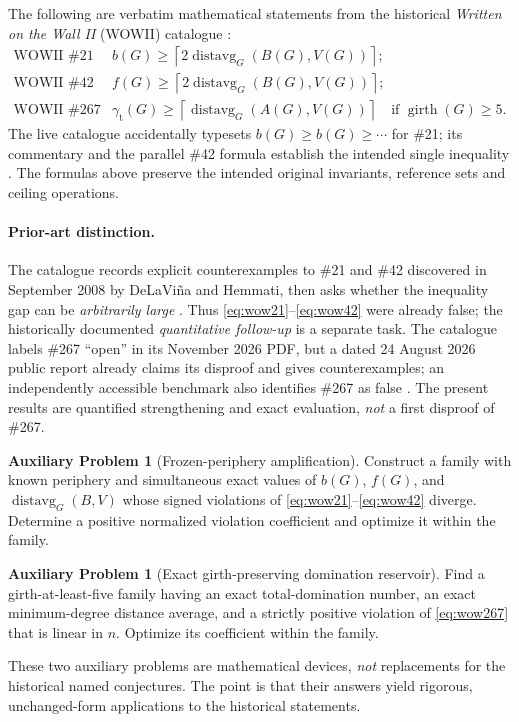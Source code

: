 \documentclass[11pt,a4paper]{article}
\theoremstyle{definition}
\newtheorem{problem}[theorem]{Auxiliary Problem}
\theoremstyle{remark}
\newcommand{\avg}{\operatorname{distavg}}
\newcommand{\girth}{\operatorname{girth}}
\newcommand{\gam}{\gamma_{\mathrm t}}
\begin{document}
The following are verbatim mathematical statements from the historical \emph{Written on the Wall II} (WOWII) catalogue \cite{wowii}:
\begin{align}
\text{WOWII \#21 (2003):}\quad& b(G)\ge\left\lceil2\avg_G(B(G),V(G))\right\rceil; \label{eq:wow21}\\
\text{WOWII \#42 (2004):}\quad& f(G)\ge\left\lceil2\avg_G(B(G),V(G))\right\rceil; \label{eq:wow42}\\
\text{WOWII \#267 (2007):}\quad& \gam(G)\ge\left\lceil\avg_G(A(G),V(G))\right\rceil
\quad\text{if }\girth(G)\ge5. \label{eq:wow267}
\end{align}
The live catalogue accidentally typesets $b(G)\ge b(G)\ge\cdots$ for \#21; its commentary and the parallel \#42 formula establish the intended single inequality \cite{wowii}. The formulas above preserve the intended original invariants, reference sets and ceiling operations.

\paragraph{Prior-art distinction.} The catalogue records explicit counterexamples to \#21 and \#42 discovered in September 2008 by DeLaVi\~na and Hemmati, then asks whether the inequality gap can be \emph{arbitrarily large} \cite{wowii}. Thus \eqref{eq:wow21}--\eqref{eq:wow42} were already false; the historically documented \emph{quantitative follow-up} is a separate task. The catalogue labels \#267 ``open'' in its November 2026 PDF, but a dated 24 August 2026 public report already claims its disproof and gives counterexamples; an independently accessible benchmark also identifies \#267 as false \cite{village,mathbench}. The present results are quantified strengthening and exact evaluation, \emph{not} a first disproof of \#267.

\begin{problem}[Frozen-periphery amplification]\label{prob:cam}
Construct a family with known periphery and simultaneous exact values of $b(G)$, $f(G)$, and $\avg_G(B,V)$ whose signed violations of \eqref{eq:wow21}--\eqref{eq:wow42} diverge. Determine a positive normalized violation coefficient and optimize it within the family.
\end{problem}
\begin{problem}[Exact girth-preserving domination reservoir]\label{prob:dom}
Find a girth-at-least-five family having an exact total-domination number, an exact minimum-degree distance average, and a strictly positive violation of \eqref{eq:wow267} that is linear in $n$. Optimize its coefficient within the family.
\end{problem}
These two auxiliary problems are mathematical devices, \emph{not} replacements for the historical named conjectures. The point is that their answers yield rigorous, unchanged-form applications to the historical statements.
\end{document}
